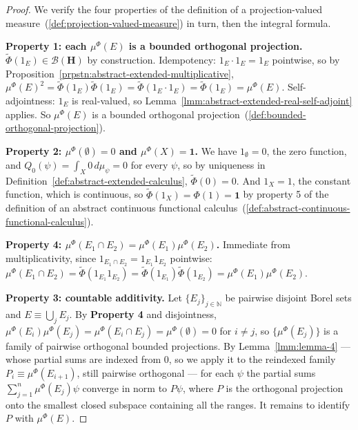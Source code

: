 \begin{proof}
    \leanok
We verify the four properties of the definition of a projection-valued measure~(\ref{def:projection-valued-measure}) in turn, then the integral formula.

\textbf{Property 1: each $\mu^\Phi(E)$ is a bounded orthogonal projection.} $\widetilde\Phi(1_E) \in \mathcal{B}(\mathbf{H})$ by construction. Idempotency: $1_E \cdot 1_E = 1_E$ pointwise, so by Proposition~\ref{prpstn:abstract-extended-multiplicative}, $\mu^\Phi(E)^2 = \widetilde\Phi(1_E)\widetilde\Phi(1_E) = \widetilde\Phi(1_E \cdot 1_E) = \widetilde\Phi(1_E) = \mu^\Phi(E)$. Self-adjointness: $1_E$ is real-valued, so Lemma~\ref{lmm:abstract-extended-real-self-adjoint} applies. So $\mu^\Phi(E)$ is a bounded orthogonal projection~(\ref{def:bounded-orthogonal-projection}).

\textbf{Property 2: $\mu^\Phi(\emptyset) = 0$ and $\mu^\Phi(X) = \mathbf{1}$.} We have $1_\emptyset = 0$, the zero function, and $Q_0(\psi) = \int_X 0 \, d\mu_\psi = 0$ for every $\psi$, so by uniqueness in Definition~\ref{def:abstract-extended-calculus}, $\widetilde\Phi(0) = 0$. And $1_X = 1$, the constant function, which is continuous, so $\widetilde\Phi(1_X) = \Phi(1) = \mathbf{1}$ by property 5 of the definition of an abstract continuous functional calculus~(\ref{def:abstract-continuous-functional-calculus}).

\textbf{Property 4: $\mu^\Phi(E_1 \cap E_2) = \mu^\Phi(E_1)\mu^\Phi(E_2)$.} Immediate from multiplicativity, since $1_{E_1 \cap E_2} = 1_{E_1}1_{E_2}$ pointwise: $\mu^\Phi(E_1\cap E_2) = \widetilde\Phi(1_{E_1}1_{E_2}) = \widetilde\Phi(1_{E_1})\widetilde\Phi(1_{E_2}) = \mu^\Phi(E_1)\mu^\Phi(E_2)$.

\textbf{Property 3: countable additivity.} Let $\{E_j\}_{j\in\mathbb{N}}$ be pairwise disjoint Borel sets and $E \equiv \bigcup_j E_j$. By \textbf{Property 4} and disjointness, $\mu^\Phi(E_i)\mu^\Phi(E_j) = \mu^\Phi(E_i\cap E_j) = \mu^\Phi(\emptyset) = 0$ for $i \ne j$, so $\{\mu^\Phi(E_j)\}$ is a family of pairwise orthogonal bounded projections. By Lemma~\ref{lmm:lemma-4} — whose partial sums are indexed from $0$, so we apply it to the reindexed family $P_i \equiv \mu^\Phi(E_{i+1})$, still pairwise orthogonal — for each $\psi$ the partial sums $\sum_{j=1}^n \mu^\Phi(E_j)\psi$ converge in norm to $P\psi$, where $P$ is the orthogonal projection onto the smallest closed subspace containing all the ranges. It remains to identify $P$ with $\mu^\Phi(E)$.


\end{proof}
